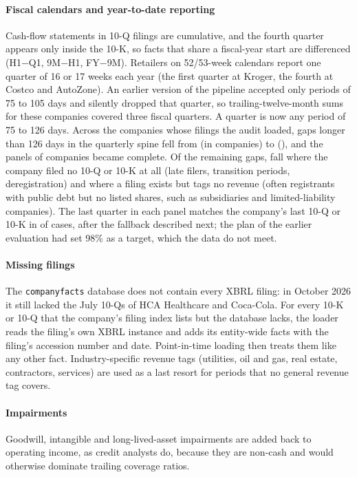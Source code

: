 \paragraph{Fiscal calendars and year-to-date reporting} Cash-flow statements in 10-Q filings are cumulative, and the fourth quarter appears only inside the 10-K, so facts that share a fiscal-year start are differenced (H1$-$Q1, 9M$-$H1, FY$-$9M). Retailers on 52/53-week calendars report one quarter of 16 or 17 weeks each year (the first quarter at Kroger, the fourth at Costco and AutoZone). An earlier version of the pipeline accepted only periods of 75 to 105 days and silently dropped that quarter, so trailing-twelve-month sums for these companies covered three fiscal quarters. A quarter is now any period of 75 to 126 days. Across the \AudLoaded{} companies whose filings the audit loaded, gaps longer than 126 days in the quarterly spine fell from \AudGapsOld{} (in \AudFirmsOld{} companies) to \AudGapsNew{} (\AudFirmsNew{}), and the panels of \AudRecovered{} companies became complete. Of the remaining gaps, \AudNoFiling{} fall where the company filed no 10-Q or 10-K at all (late filers, transition periods, deregistration) and \AudUntagged{} where a filing exists but tags no revenue (often registrants with public debt but no listed shares, such as subsidiaries and limited-liability companies). The last quarter in each panel matches the company's last 10-Q or 10-K in \AudLatest{} of cases, after the fallback described next; the plan of the earlier evaluation had set 98\% as a target, which the data do not meet.

\paragraph{Missing filings} The \texttt{companyfacts} database does not contain every XBRL filing: in October 2026 it still lacked the July 10-Qs of HCA Healthcare and Coca-Cola. For every 10-K or 10-Q that the company's filing index lists but the database lacks, the loader reads the filing's own XBRL instance and adds its entity-wide facts with the filing's accession number and date. Point-in-time loading then treats them like any other fact. Industry-specific revenue tags (utilities, oil and gas, real estate, contractors, services) are used as a last resort for periods that no general revenue tag covers.

\paragraph{Impairments} Goodwill, intangible and long-lived-asset impairments are added back to operating income, as credit analysts do, because they are non-cash and would otherwise dominate trailing coverage ratios.


